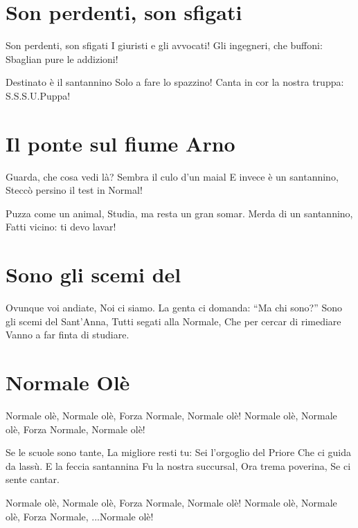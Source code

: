 \section{Son perdenti, son sfigati}
\subtitle{Sul canto tipico dei marines}

\subtitle{Ogni verso si canta due volte}
\begin{canzone}
Son perdenti, son sfigati
I giuristi e gli avvocati!
Gli ingegneri, che buffoni:
Sbaglian pure le addizioni!

Destinato è il santannino
Solo a fare lo spazzino!
Canta in cor la nostra truppa:
S.S.S.U.Puppa!
\end{canzone}

\section{Il ponte sul fiume Arno}
\subtitle{Su “Colonel Bogey March” dal film “Il ponte sul fiume Kwai”}
\begin{canzone}
Guarda, che cosa vedi là?
Sembra il culo d’un maial
E invece è un santannino,
Steccò persino il test in Normal!

Puzza come un animal,
Studia, ma resta un gran somar.
Merda di un santannino,
Fatti vicino: ti devo lavar!
\end{canzone}

\section{Sono gli scemi del \santanna}
\subtitle{Ogni verso si canta due volte}
\begin{canzone}
Ovunque voi andiate,
Noi ci siamo.
La genta ci domanda:
“Ma chi sono?”
Sono gli scemi del Sant’Anna,
Tutti segati alla Normale,
Che per cercar di rimediare
Vanno a far finta di studiare. 
\end{canzone}

\section{Normale Olè}
\subtitle{Sulla melodia dell’inno della Sampdoria}
\begin{canzone}
Normale olè, Normale olè,
Forza Normale, Normale olè!
Normale olè, Normale olè,
Forza Normale, Normale olè!

Se le scuole sono tante,
La migliore resti tu:
Sei l'orgoglio del Priore
Che ci guida da lassù.
E la feccia santannina
Fu la nostra succursal,
Ora trema poverina,
Se ci sente cantar.

Normale olè, Normale olè,
Forza Normale, Normale olè!
Normale olè, Normale olè,
Forza Normale, ...Normale olè!
\end{canzone}

